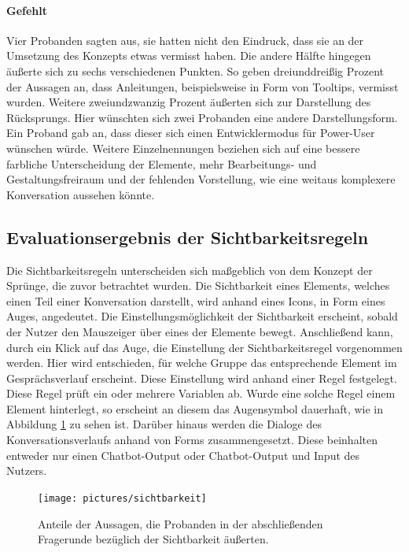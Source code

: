 \paragraph{Gefehlt}Vier Probanden sagten aus, sie hatten nicht den Eindruck, dass sie an der Umsetzung des Konzepts etwas vermisst haben. Die andere Hälfte hingegen äußerte sich zu sechs verschiedenen Punkten. So geben dreiunddreißig Prozent der Aussagen an, dass Anleitungen, beispielsweise in Form von Tooltips, vermisst wurden. Weitere zweiundzwanzig Prozent äußerten sich zur Darstellung des Rücksprungs. Hier wünschten sich zwei Probanden eine andere Darstellungsform. Ein Proband gab an, dass dieser sich einen Entwicklermodus für Power-User wünschen würde. Weitere Einzelnennungen beziehen sich auf eine bessere farbliche Unterscheidung der Elemente, mehr Bearbeitungs- und Gestaltungsfreiraum und der fehlenden Vorstellung, wie eine weitaus komplexere Konversation aussehen könnte.    

\subsection{Evaluationsergebnis der Sichtbarkeitsregeln}
Die Sichtbarkeitsregeln unterscheiden sich maßgeblich von dem Konzept der Sprünge, die zuvor betrachtet wurden. Die Sichtbarkeit eines Elements, welches einen Teil einer Konversation darstellt, wird anhand eines Icons, in Form eines Auges, angedeutet. Die Einstellungsmöglichkeit der Sichtbarkeit erscheint, sobald der Nutzer den Mauszeiger über eines der Elemente bewegt. Anschließend kann, durch ein Klick auf das Auge, die Einstellung der Sichtbarkeitsregel vorgenommen werden. Hier wird entschieden, für welche Gruppe das entsprechende Element im Gesprächsverlauf erscheint. Diese Einstellung wird anhand einer Regel festgelegt. Diese Regel prüft ein oder mehrere Variablen ab. Wurde eine solche Regel einem Element hinterlegt, so erscheint an diesem das Augensymbol dauerhaft, wie in Abbildung \ref{sichtbarkeit} zu sehen ist. Darüber hinaus werden die Dialoge des Konversationsverlaufs anhand von Forms zusammengesetzt. Diese beinhalten entweder nur einen Chatbot-Output oder Chatbot-Output und Input des Nutzers. 

\begin{figure}[h]
\centering
\texttt{[image: pictures/sichtbarkeit]}
\caption{Anteile der Aussagen, die Probanden in der abschließenden Fragerunde bezüglich der Sichtbarkeit äußerten.}
\label{sichtbarkeit}
\end{figure}

